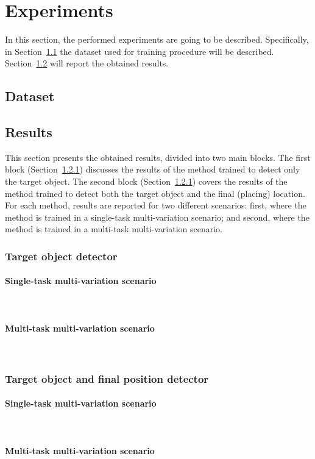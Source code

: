 \section{Experiments}
\label{sec:cod_experimental}
In this section, the performed experiments are going to be described. Specifically, in  
Section~\ref{sec:cod_dataset} the dataset used for training procedure will be described. Section~\ref{sec:cod_results} will report the obtained results.
\subsection{Dataset}
\label{sec:cod_dataset}

\subsection{Results}
\label{sec:cod_results}
This section presents the obtained results, divided into two main blocks. The first block (Section~\ref{sec:cod_tod}) discusses the results of the method trained to detect only the target object. The second block (Section~\ref{sec:cod_tod}) covers the results of the method trained to detect both the target object and the final (placing) location. For each method, results are reported for two different scenarios: first, where the method is trained in a single-task multi-variation scenario; and second, where the method is trained in a multi-task multi-variation scenario.

\subsubsection{Target object detector}
\label{sec:cod_tod}
\paragraph*{Single-task multi-variation scenario}\mbox{}\\
\paragraph*{Multi-task multi-variation scenario}\mbox{}\\

\subsubsection{Target object and final position detector}
\label{sec:cod_tofpd}
\paragraph*{Single-task multi-variation scenario}\mbox{}\\
\paragraph*{Multi-task multi-variation scenario}\mbox{}\\